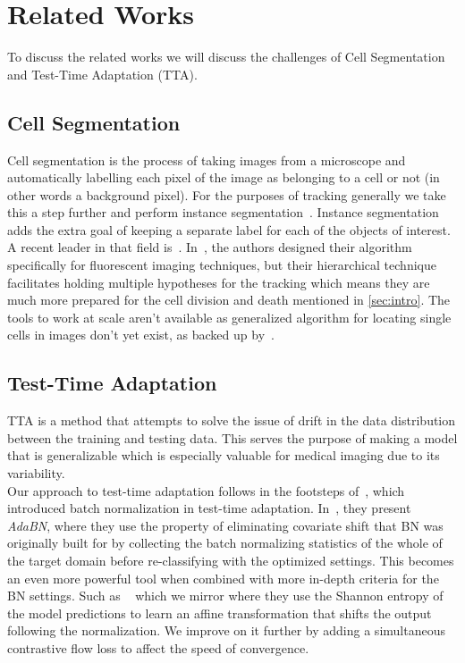 \section{Related Works}
\label{sec:RW}
To discuss the related works we will discuss the challenges of Cell Segmentation and Test-Time Adaptation (TTA).

\subsection{Cell Segmentation}

Cell segmentation is the process of taking images from a microscope and automatically labelling each pixel of the image as belonging to a cell or not (in other words a background pixel).  For the purposes of tracking generally we take this a step further and perform instance segmentation~\cite{Yang_2019_ICCV}.  Instance segmentation adds the extra goal of keeping a separate label for each of the objects of interest.  \\ 

A recent leader in that field is~\cite{bragantini2024ucmtracking}.  In~\cite{bragantini2024ucmtracking}, the authors designed their algorithm specifically for fluorescent imaging techniques, but their hierarchical technique facilitates holding multiple hypotheses for the tracking which means they are much more prepared for the cell division and death mentioned in \ref{sec:intro}.  The tools to work at scale aren't available as generalized algorithm for locating  single cells in images don't yet exist, as backed up by~\cite{greenwald2022whole}.


\subsection{Test-Time Adaptation}
\label{sec:TTARW}

TTA is a method that attempts to solve the issue of drift in the data distribution between the training and testing data. This serves the purpose of making a model that is generalizable which is especially valuable for medical imaging due to its variability. 
\\

Our approach to test-time adaptation follows in the footsteps of~\cite{Li2018-el}, which introduced batch normalization in test-time adaptation. In~\cite{Li2018-el}, they present \textit{AdaBN}, where they use the property of eliminating covariate shift that BN was originally built for by collecting the batch normalizing statistics of the whole of the target domain before re-classifying with the optimized settings.  This becomes an even more powerful tool when combined with more in-depth criteria for the BN settings.  Such as ~\cite{wang2020tent} which we mirror where they use the Shannon entropy of the model predictions to learn an affine transformation that shifts the output following the normalization.  We improve on it further by adding a simultaneous contrastive flow loss to affect the speed of convergence.\\

